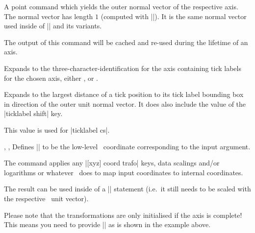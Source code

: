 \begin{command}{\pgfplotspointouternormalvectorofaxis{}}
	A point command which yields the outer normal vector of the respective axis. The normal vector has length $1$ (computed with |\pgfpointnormalised|). It is the same normal vector used inside of |\pgfplotsqpointoutsideofaxis| and its variants.

	The output of this command will be cached and re-used during the lifetime of an axis. 
\end{command}

\begin{command}{\pgfplotsticklabelaxisspec{}}
	Expands to the three-character-identification for the axis containing tick labels for the chosen axis, either ,  or .
\end{command}

\begin{command}{\pgfplotsvalueoflargesttickdimen{}}
	Expands to the largest distance of a tick position to its tick label bounding box in direction of the outer unit normal vector. It does also include the value of the |ticklabel shift| key.

	This value is used for |ticklabel cs|.
\end{command}

\begin{commandlist}{%
	\pgfplotstransformcoordinatex{},%
	\pgfplotstransformcoordinatey{},%
	\pgfplotstransformcoordinatey{}}
	Defines |\pgfmathresult| to be the low-level \PGF\ coordinate corresponding to the input argument.

	The command applies any |[xyz] coord trafo| keys, data scalings and/or logarithms or whatever \PGFPlots\ does to map input coordinates to internal coordinates.

	The result can be used inside of a |\pgfpointxy| statement (i.e.\ it still needs to be scaled with the respective \PGF\ unit vector).
\begin{codeexample}[]
\end{codeexample}
	Please note that the transformations are only initialised if the axis is complete! This means you need to provide |\pgfplotsextra| as is shown in the example above.
\end{commandlist}

